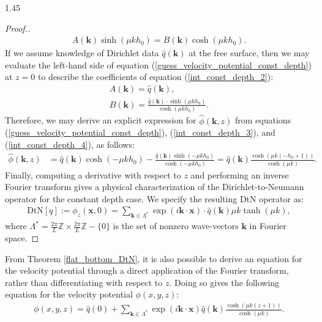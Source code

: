 \documentclass[12pt,titlepage]{article}
\theoremstyle{definition}
\theoremstyle{remark}
\newcommand{\Z}{\mathbb{Z}}
\newcommand{\M}[1]{\mathbf{#1}}
\begin{document}
\begin{spacing}{1.45}
\begin{proof}[Proof.]
\begin{align}
\label{int_const_depth_2}
     A(\M{k}) \sinh(\mu k h_0) = B(\M{k}) \cosh(\mu k h_0).
\end{align}
If we assume knowledge of Dirichlet data $\hat{q}(\M{k})$ at the free surface, then we may evaluate the left-hand side of equation (\ref{guess_velocity_potential_const_depth}) at $z = 0$ to describe the coefficients of equation (\ref{int_const_depth_2}):
\begin{align}
\label{int_const_depth_3}
    A(\M{k}) = \hat{q}(\M{k}), \\
\label{int_const_depth_4}
     B(\M{k}) = \frac{\hat{q}(\M{k}) \cdot \sinh(\mu k h_0)}{\cosh(\mu k h_0)}.
\end{align}
Therefore, we may derive an explicit expression for $\hat{\phi}(\M{k}, z)$ from equations (\ref{guess_velocity_potential_const_depth}), (\ref{int_const_depth_3}), and (\ref{int_const_depth_4}), as follows:
\begin{align}
\label{vel_pot_almost}
    \hat{\phi}(\M{k}, z) &= \hat{q}(\M{k}) \cosh(-\mu k h_0) - \frac{\hat{q}(\M{k}) \sinh(-\mu k h_0)}{\cosh(-\mu k h_0)} 
= \hat{q}(\M{k}) \frac{\cosh(\mu k (-h_0 + 1) )}{\cosh(\mu k)}.
\end{align}
Finally, computing a derivative with respect to $z$ and performing an inverse Fourier transform gives a physical characterization of the Dirichlet-to-Neumann operator for the constant depth case. We specify the resulting DtN operator as:
\begin{align*}
    \text{DtN}[q] := \phi_z(\M{x}, 0) = \sum_{\M{k} \in \Lambda^*} \exp(i \M{k} \cdot \M{x}) \cdot \hat{q}(\M{k}) \mu k \tanh(\mu k),
\end{align*}
where $\Lambda^* = \frac{2\pi}{L} \Z \times \frac{2\pi}{L} \Z - \{0\}$ is the set of nonzero wave-vectors $\M{k}$ in Fourier space. 
\end{proof}
    From Theorem \ref{flat_bottom_DtN}, it is also possible to derive an equation for the velocity potential through a direct application of the Fourier transform, rather than differentiating with respect to $z$. Doing so gives the following equation for the velocity potential $\phi(x, y, z)$:
\begin{align}
\label{vel_pot}
    \phi(x, y, z) = \hat{q}(0) + \sum_{\M{k} \in \Lambda^*} \exp(i \M{k} \cdot \M{x}) \hat{q}(\M{k}) \frac{\cosh(\mu k (z + 1) )}{\cosh(\mu k)}.
\end{align}


\end{spacing}
\end{document}
